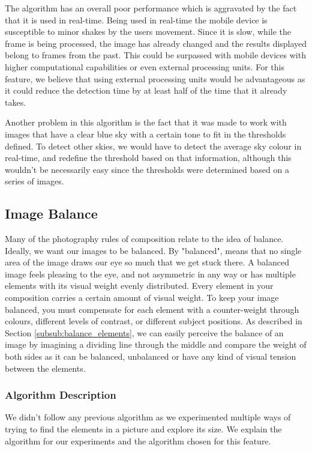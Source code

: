 The algorithm has an overall poor performance which is aggravated by the fact that it is used in real-time. Being used in real-time the mobile device is susceptible to minor shakes by the users movement. Since it is slow, while the frame is being processed, the image has already changed and the results displayed belong to frames from the past. This could be surpassed with mobile devices with higher computational capabilities or even external processing units. For this feature, we believe that using external processing units would be advantageous as it could reduce the detection time by at least half of the time that it already takes.

Another problem in this algorithm is the fact that it was made to work with images that have a clear blue sky with a certain tone to fit in the thresholds defined. To detect other skies, we would have to detect the average sky colour in real-time, and redefine the threshold based on that information, although this wouldn't be necessarily easy since the thresholds were determined based on a series of images.

\subsection{Image Balance}
\label{sub:balance}
Many of the photography rules of composition relate to the idea of balance. Ideally, we want our images to be balanced. By "balanced", means that no single area of the image draws our eye so much that we get stuck there. A balanced image feels pleasing to the eye, and not asymmetric in any way or has multiple elements with its visual weight evenly distributed. Every element in your composition carries a certain amount of visual weight. To keep your image balanced, you must compensate for each element with a counter-weight through colours, different levels of contrast, or different subject positions. As described in Section \ref{subsub:balance_elements}, we can easily perceive the balance of an image by imagining a dividing line through the middle and compare the weight of both sides as it can be balanced, unbalanced or have any kind of visual tension between the elements.

\subsubsection{Algorithm Description}

We didn't follow any previous algorithm as we experimented multiple ways of trying to find the elements in a picture and explore its size. We explain the algorithm for our experiments and the algorithm chosen for this feature.

